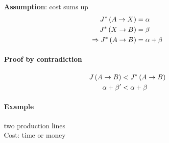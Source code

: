 \begin{figure}[H]
    \centering
    \def\svgwidth{0.8\columnwidth}
    
\end{figure}

\textbf{Assumption}: cost sums up
\begin{align*}
    J^* \left( A \rightarrow X \right) &= \alpha\\
    J^* \left( X \rightarrow B \right) &= \beta\\
    \Rightarrow J^* \left( A \rightarrow B \right) &= \alpha + \beta
\end{align*}

\paragraph{Proof by contradiction}
\begin{align*}
    J \left( A \rightarrow B \right) &< J^* \left( A \rightarrow B \right)\\
    \alpha + \beta ' &< \alpha + \beta
\end{align*}

\paragraph{Example} two production lines\\
Cost: time or money

